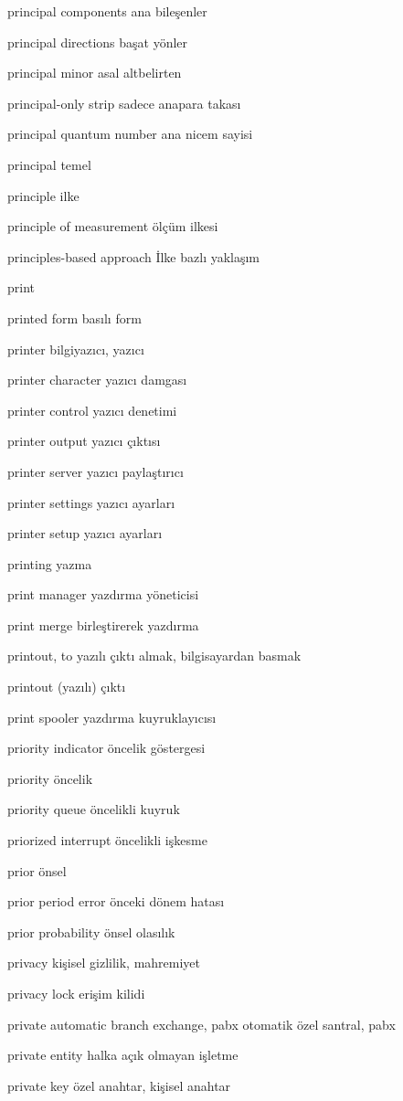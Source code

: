 \documentclass[12pt,fleqn]{article}\usepackage{../../common}
\begin{document}
principal components ana bileşenler

principal directions başat yönler

principal minor asal altbelirten

principal-only strip sadece anapara takası

principal quantum number ana nicem sayisi

principal temel

principle ilke

principle of measurement ölçüm ilkesi

principles-based approach İlke bazlı yaklaşım

print

printed form basılı form

printer bilgiyazıcı, yazıcı

printer character yazıcı damgası

printer control yazıcı denetimi

printer output yazıcı çıktısı

printer server yazıcı paylaştırıcı

printer settings yazıcı ayarları

printer setup yazıcı ayarları

printing yazma

print manager yazdırma yöneticisi

print merge birleştirerek yazdırma

printout, to yazılı çıktı almak, bilgisayardan basmak

printout (yazılı) çıktı

print spooler yazdırma kuyruklayıcısı

priority indicator öncelik göstergesi

priority öncelik

priority queue öncelikli kuyruk

priorized interrupt öncelikli işkesme

prior önsel

prior period error önceki dönem hatası

prior probability önsel olasılık

privacy kişisel gizlilik, mahremiyet

privacy lock erişim kilidi

private automatic branch exchange, pabx otomatik özel santral, pabx

private entity halka açık olmayan işletme

private key özel anahtar, kişisel anahtar
\end{document}
